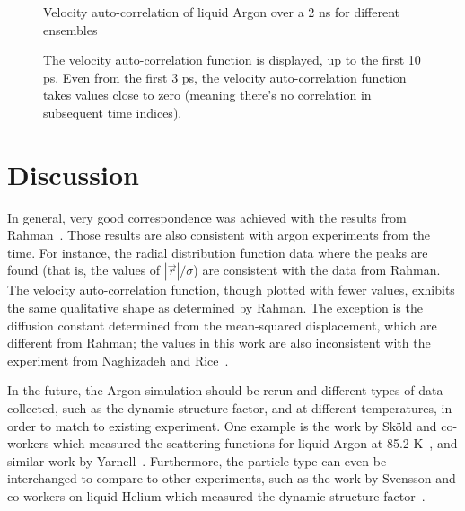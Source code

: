 \documentclass[12pt]{article}
\begin{document}
\begin{figure}
	\centering
	Velocity auto-correlation of liquid Argon over a 2 ns for different ensembles\\
	\begin{subfigure}[b]{0.5\textwidth}
		
		\caption{}
		\label{fig:velacc864}
	\end{subfigure}%
	\begin{subfigure}[b]{0.5\textwidth}
		
		\caption{}
		\label{fig:velacc1728}
	\end{subfigure}
	\caption{The velocity auto-correlation function is displayed, up to the first 10 ps. Even from the first 3 ps, the velocity auto-correlation function takes values close to zero (meaning there's no correlation in subsequent time indices). }
	\label{fig:velacc}
\end{figure}

\clearpage

\section{Discussion}

In general, very good correspondence was achieved with the results from Rahman~\cite{Rahman1964}. Those results are also consistent with argon experiments from the time. For instance, the radial distribution function data where the peaks are found (that is, the values of $|\vec{r}|/\sigma$) are consistent with the data from Rahman. The velocity auto-correlation function, though plotted with fewer values, exhibits the same qualitative shape as determined by Rahman. The exception is the diffusion constant determined from the mean-squared displacement, which are different from Rahman; the values in this work are also inconsistent with the experiment from Naghizadeh and Rice~\cite{Naghizadeh1962}.

In the future, the Argon simulation should be rerun and different types of data collected, such as the dynamic structure factor, and at different temperatures, in order to match to existing experiment. One example is the work by Sk\"old and co-workers which measured the scattering functions for liquid Argon at 85.2 K~\cite{Skoeld1972}, and similar work by Yarnell~\cite{Yarnell1973}.
Furthermore, the particle type can even be interchanged to compare to other experiments, such as the work by Svensson and co-workers on liquid Helium which measured the dynamic structure factor~\cite{Svensson1980}.

\clearpage
\end{document}
